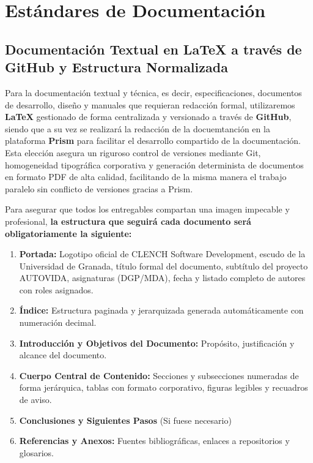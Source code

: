 \newpage
\section{Estándares de Documentación}

\subsection{Documentación Textual en LaTeX a través de GitHub y Estructura Normalizada}
Para la documentación textual y técnica, es decir, especificaciones, documentos de desarrollo, diseño y manuales que requieran redacción formal, utilizaremos \textbf{\LaTeX{}} gestionado de forma centralizada y versionado a través de \textbf{GitHub}, siendo que a su vez se realizará la redacción de la docuemtanción en la plataforma \textbf{Prism} para facilitar el desarrollo compartido de la documentación. Esta elección asegura un riguroso control de versiones mediante Git, homogeneidad tipográfica corporativa y generación determinista de documentos en formato PDF de alta calidad, facilitando de la misma manera el trabajo paralelo sin conflicto de versiones gracias a Prism.

Para asegurar que todos los entregables compartan una imagen impecable y profesional, \textbf{la estructura que seguirá cada documento será obligatoriamente la siguiente:}
\begin{enumerate}[leftmargin=*]
  \item \textbf{Portada:} Logotipo oficial de CLENCH Software Development, escudo de la Universidad de Granada, título formal del documento, subtítulo del proyecto AUTOVIDA, asignaturas (DGP/MDA), fecha y listado completo de autores con roles asignados.
  \item \textbf{Índice:} Estructura paginada y jerarquizada generada automáticamente con numeración decimal.
  \item \textbf{Introducción y Objetivos del Documento:} Propósito, justificación y alcance del documento.
  \item \textbf{Cuerpo Central de Contenido:} Secciones y subsecciones numeradas de forma jerárquica, tablas con formato corporativo, figuras legibles y recuadros de aviso.
  \item \textbf{Conclusiones y Siguientes Pasos} (Si fuese necesario)
  \item \textbf{Referencias y Anexos:} Fuentes bibliográficas, enlaces a repositorios y glosarios.
\end{enumerate}

